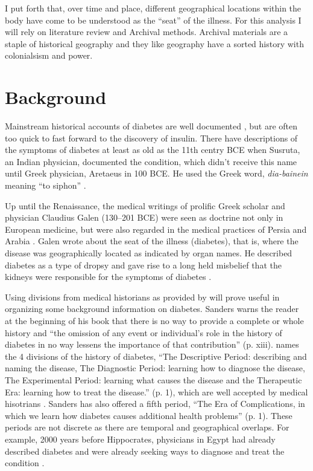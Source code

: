 \documentclass[12pt]{article}
\begin{document}
I put forth that, over time and place, different geographical locations within the body have come to be understood as the ``seat'' of the illness.  For this analysis I will rely on literature review and Archival methods. Archival materials are a staple of historical geography and they like geography have a sorted history with colonialsism and power. 

\section{Background}
\doublespacing
Mainstream historical accounts of diabetes are well documented \citep{engelhardt_diabetes_1989, tattersall_diabetes_2009}, but are often too quick to fast forward to the discovery of insulin. There have descriptions of the symptoms of diabetes at least as old as the 11th centry BCE when Susruta, an Indian physician, documented the condition, which didn't receive this name until Greek physician, Aretaeus in 100 BCE. He used the Greek word, \textit {dia-bainein} meaning ``to siphon'' \citep{sattley_history_1996}.  

Up until the Renaissance, the medical writings of prolific Greek scholar and physician Claudius Galen (130--201 BCE) were seen as doctrine not only in European medicine, but were also regarded in the medical practices of Persia and Arabia \citep{henschen_1969_term}. Galen wrote about the seat of the illness (diabetes), that is, where the disease was geographically located as indicated by organ names. He described diabetes as a type of dropsy and gave rise to a long held misbelief that the kidneys were responsible for the symptoms of diabetes \citep{henschen_1969_term}. 

Using divisions from medical historians as provided by \citet{sanders_2001_philatelic} will prove useful in organizing some background information on diabetes. Sanders warns the reader at the beginning of his book that there is no way to provide a complete or whole history and ``the omission of any event or individual's role in the history of diabetes in no way lessens the importance of that contribution'' (p. xiii). 
\citet{sanders_2001_philatelic} names the 4 divisions of the history of diabetes, ``The Descriptive Period: describing and naming the disease, The Diagnostic Period: learning how to diagnose the disease, The Experimental Period: learning what causes the disease and the Therapeutic Era: learning how to treat the disease.'' (p. 1), which are well accepted by medical hisotrians \citep{papaspyros_1964_history}. Sanders has also offered a fifth period, ``The Era of Complications, in which we learn how diabetes causes additional health problems'' (p. 1). These periods are not discrete as there are temporal and geographical overlaps. For example, 2000 years before Hippocrates, physicians in Egypt had already described diabetes and were already seeking ways to diagnose and treat the condition \citep{sanders_2001_philatelic}. 
\end{document}
